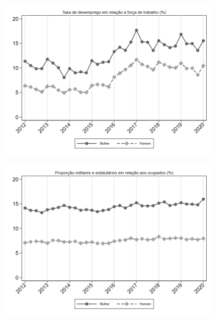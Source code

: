 \begin{frame}[label=_composicao_demografica_genero_taxa_de_desemprego]{}
\textit{\hyperlink{_composicao_demografica_genero}{}}
\begin{figure}
  \centering
  \includegraphics[width=1.0\linewidth]{../../analysis/output/composicao_demografica/genero/_composicao_demografica_genero_taxa_de_desemprego.png}
  \caption{}
  \label{fig:_composicao_demografica_genero_taxa_de_desemprego}
\end{figure}
\end{frame}

\begin{frame}[label=_composicao_demografica_genero_prop_militar]{}
\textit{\hyperlink{_composicao_demografica_genero}{}}
\begin{figure}
  \centering
  \includegraphics[width=1.0\linewidth]{../../analysis/output/composicao_demografica/genero/_composicao_demografica_genero_prop_militar.png}
  \caption{}
  \label{fig:_composicao_demografica_genero_prop_militar}
\end{figure}
\end{frame}


